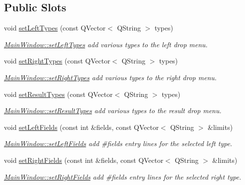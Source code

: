 \subsection*{Public Slots}
\begin{DoxyCompactItemize}
\item 
void \hyperlink{class_main_window_ae065551040ada6411fc1fb4f3887dd3b}{set\+Left\+Types} (const Q\+Vector$<$ Q\+String $>$ types)
\begin{DoxyCompactList}\small\item\em \hyperlink{class_main_window_ae065551040ada6411fc1fb4f3887dd3b}{Main\+Window\+::set\+Left\+Types} add various types to the left drop menu. \end{DoxyCompactList}\item 
void \hyperlink{class_main_window_aca464c6893a9551372c043cb3bf7bf56}{set\+Right\+Types} (const Q\+Vector$<$ Q\+String $>$ types)
\begin{DoxyCompactList}\small\item\em \hyperlink{class_main_window_aca464c6893a9551372c043cb3bf7bf56}{Main\+Window\+::set\+Right\+Types} add various types to the right drop menu. \end{DoxyCompactList}\item 
void \hyperlink{class_main_window_a5e2ad194f3764cb9a321b01193c53be9}{set\+Result\+Types} (const Q\+Vector$<$ Q\+String $>$ types)
\begin{DoxyCompactList}\small\item\em \hyperlink{class_main_window_a5e2ad194f3764cb9a321b01193c53be9}{Main\+Window\+::set\+Result\+Types} add various types to the result drop menu. \end{DoxyCompactList}\item 
void \hyperlink{class_main_window_a48d094bc4e7965be372f62d2f6e6d910}{set\+Left\+Fields} (const int \&fields, const Q\+Vector$<$ Q\+String $>$ \&limits)
\begin{DoxyCompactList}\small\item\em \hyperlink{class_main_window_a48d094bc4e7965be372f62d2f6e6d910}{Main\+Window\+::set\+Left\+Fields} add \#fields entry lines for the selected left type. \end{DoxyCompactList}\item 
void \hyperlink{class_main_window_a8cbaa03b855c6ab3bb7a910662346549}{set\+Right\+Fields} (const int \&fields, const Q\+Vector$<$ Q\+String $>$ \&limits)
\begin{DoxyCompactList}\small\item\em \hyperlink{class_main_window_a8cbaa03b855c6ab3bb7a910662346549}{Main\+Window\+::set\+Right\+Fields} add \#fields entry lines for the selected right type. \end{DoxyCompactList}\item 

\end{DoxyCompactItemize}
